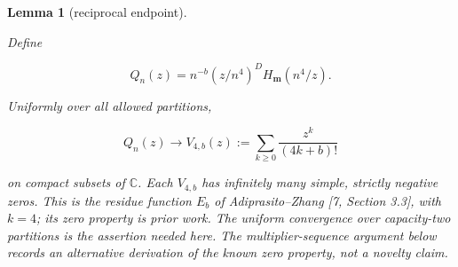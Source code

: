 \documentclass[11pt]{article}
\newtheorem{lemma}[theorem]{Lemma}
\begin{document}
\Needspace{0.16\textheight}
\begin{lemma}[reciprocal endpoint]
\label{lemma:4-2}

Define

\[
Q_n(z)=n^{-b}(z/n^4)^D H_{\mathbf m}(n^4/z).
\]

Uniformly over all allowed partitions,

\[
Q_n(z)\longrightarrow V_{4,b}(z):=
\sum_{k\ge0}\frac{z^k}{(4k+b)!} \tag{4.2}
\]

on compact subsets of $\mathbb C$.  Each $V_{4,b}$ has infinitely many
simple, strictly negative zeros.  This is the residue function $E_b$ of
Adiprasito--Zhang [7, Section 3.3], with $k=4$; its zero property is prior
work.  The uniform convergence over capacity-two partitions is the assertion
needed here.  The multiplier-sequence argument below records an alternative
derivation of the known zero property, not a novelty claim.

\end{lemma}
\end{document}
